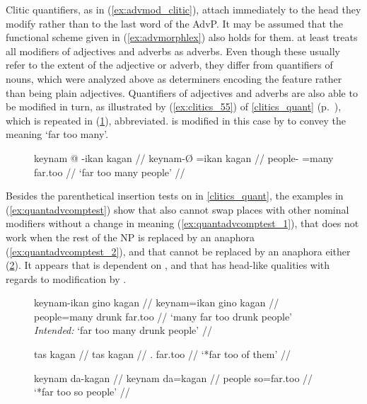 Clitic quantifiers, as in
(\ref{ex:advmod_clitic}), attach immediately to the head they modify rather than
to the last word of the AdvP. It may be assumed that the functional scheme given
in (\ref{ex:advmorphlex}) also holds for them. \citet{carnie2013} at least
treats all modifiers of adjectives and adverbs as adverbs.
Even though these usually refer to the extent of the adjective
or adverb, they differ from quantifiers of nouns, which were
analyzed above as determiners encoding the \Quant{} feature rather than being
plain adjectives. Quantifiers of
adjectives and adverbs are also able to be modified in turn,
as illustrated by (\ref{ex:clitics_55}) of \autoref{clitics_quant}
(p.~\pageref{ex:clitics_55}), which is repeated in (\ref{ex:clitics_55_short}),
abbreviated.  is modified in this case by
 to convey the meaning `far too many'.

\begin{figure}
\ex\label{ex:clitics_55_short}%
\begingl
	\gla keynam @ -ikan kagan //
	\glb keynam-Ø =ikan kagan //
	\glc people-\Top{} =many far.too //
	\glft `far too many people' //
\endgl
\xe
\end{figure}

Besides the parenthetical insertion tests on  in
\autoref{clitics_quant}, the examples in (\ref{ex:quantadvcomptest}) show that
 also cannot swap places with other nominal modifiers without
a change in meaning (\ref{ex:quantadvcomptest_1}), that  does
not work when the rest of the NP is replaced by an anaphora
(\ref{ex:quantadvcomptest_2}), and that  cannot be replaced
by an anaphora either (\ref{ex:quantadvcomptest_3}). It appears that
 is dependent on , and that
 has head-like qualities with regards to modification by
.

\begin{figure}
\pex\label{ex:quantadvcomptest}
\a\ljudge\excl\label{ex:quantadvcomptest_1}\begingl
	\gla keynam-ikan gino kagan //
	\glb keynam=ikan gino kagan //
	\glc people=many drunk far.too //
	\glft `many far too drunk people'\\
		\textit{Intended:} `far too many drunk people' //
\endgl

\a\ljudge*\label{ex:quantadvcomptest_2}\begingl
	\gla tas kagan //
	\glb tas kagan //
	\glc \TplM{}.\Parg{} far.too //
	\glft `*far too of them' //
\endgl

\a\ljudge*\label{ex:quantadvcomptest_3}\begingl
	\gla keynam da-kagan //
	\glb keynam da=kagan //
	\glc people so=far.too //
	\glft `*far too so people' //
\endgl

\xe
\end{figure}

